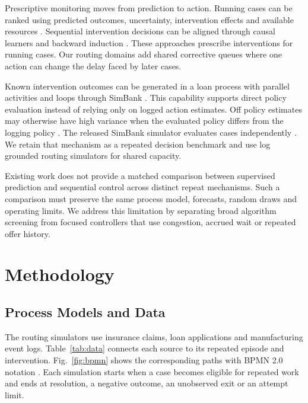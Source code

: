\documentclass[conference]{IEEEtran}
\begin{document}
Prescriptive monitoring moves from prediction to action. Running cases can be ranked using predicted outcomes, uncertainty, intervention effects and available resources \cite{shoush}. Sequential intervention decisions can be aligned through causal learners and backward induction \cite{scope}. These approaches prescribe interventions for running cases. Our routing domains add shared corrective queues where one action can change the delay faced by later cases.

Known intervention outcomes can be generated in a loan process with parallel activities and loops through SimBank \cite{simbank}. This capability supports direct policy evaluation instead of relying only on logged action estimates. Off policy estimates may otherwise have high variance when the evaluated policy differs from the logging policy \cite{ope}. The released SimBank simulator evaluates cases independently \cite{simbank}. We retain that mechanism as a repeated decision benchmark and use log grounded routing simulators for shared capacity.

Existing work does not provide a matched comparison between supervised prediction and sequential control across distinct repeat mechanisms. Such a comparison must preserve the same process model, forecasts, random draws and operating limits. We address this limitation by separating broad algorithm screening from focused controllers that use congestion, accrued wait or repeated offer history.

\section{Methodology}
\label{sec:methodology}

\subsection{Process Models and Data}

The routing simulators use insurance claims, loan applications and manufacturing event logs. Table~\ref{tab:data} connects each source to its repeated episode and intervention. Fig.~\ref{fig:bpmn} shows the corresponding paths with BPMN 2.0 notation \cite{bpmn}. Each simulation starts when a case becomes eligible for repeated work and ends at resolution, a negative outcome, an unobserved exit or an attempt limit.
\end{document}

